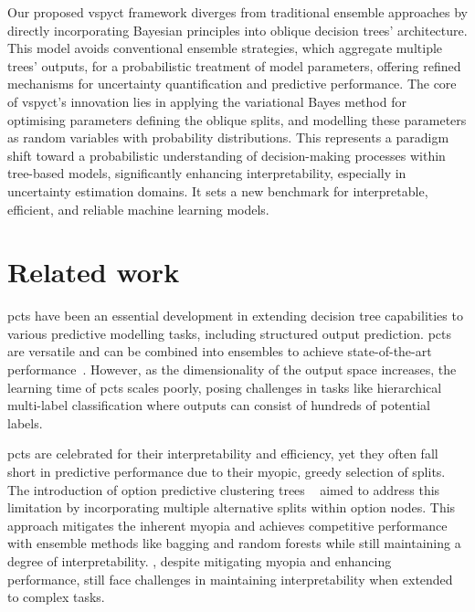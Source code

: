 \documentclass[3p,review,authoryear]{elsarticle}
\begin{document}
Our proposed \gls{vspyct} framework diverges from traditional ensemble approaches by directly incorporating Bayesian principles into oblique decision trees' architecture.
This model avoids conventional ensemble strategies, which aggregate multiple trees' outputs, for a probabilistic treatment of model parameters, offering refined mechanisms for uncertainty quantification and predictive performance.
The core of \gls{vspyct}'s innovation lies in applying the variational Bayes method for optimising parameters defining the oblique splits, and modelling these parameters as random variables with probability distributions.
This represents a paradigm shift toward a probabilistic understanding of decision-making processes within tree-based models, significantly enhancing interpretability, especially in uncertainty estimation domains.
It sets a new benchmark for interpretable, efficient, and reliable machine learning models.



\section{Related work}


\Glspl{pct} have been an essential development in extending decision tree capabilities to various predictive modelling tasks, including structured output prediction.
\Glspl{pct} are versatile and can be combined into ensembles to achieve state-of-the-art performance~\citep{Kocev_2013}.
However, as the dimensionality of the output space increases, the learning time of \glspl{pct} scales poorly, posing challenges in tasks like hierarchical multi-label classification where outputs can consist of hundreds of potential labels.

\Glspl{pct} are celebrated for their interpretability and efficiency, yet they often fall short in predictive performance due to their myopic, greedy selection of splits.
The introduction of option predictive clustering trees ~\citep{Stepisnik_2020} aimed to address this limitation by incorporating multiple alternative splits within option nodes.
This approach mitigates the inherent myopia and achieves competitive performance with ensemble methods like bagging and random forests while still maintaining a degree of interpretability.
, despite mitigating myopia and enhancing performance, still face challenges in maintaining interpretability when extended to complex tasks.
\end{document}
